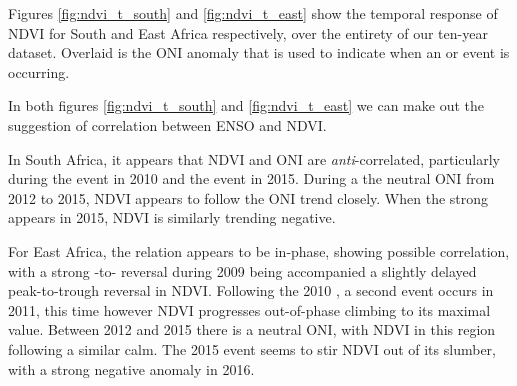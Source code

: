 Figures \ref{fig:ndvi_t_south} and \ref{fig:ndvi_t_east} show the
temporal response of NDVI for South and East Africa respectively, over
the entirety of our ten-year dataset. Overlaid is the ONI anomaly that
is used to indicate when an \elnino{} or \nina{} event is occurring.

In both figures \ref{fig:ndvi_t_south} and \ref{fig:ndvi_t_east} we
can make out the suggestion of correlation between ENSO and NDVI.

In South Africa, it appears that NDVI and ONI are
\emph{anti}-correlated, particularly during the \nina{} event in 2010
and the \elnino{} event in 2015. During a the neutral ONI from 2012 to
2015, NDVI appears to follow the ONI trend closely. When the strong
\elnino{} appears in 2015, NDVI is similarly trending negative.

For East Africa, the relation appears to be in-phase, showing possible
correlation, with a strong \elnino{}-to-\nina{} reversal during 2009
being accompanied a slightly delayed peak-to-trough reversal in
NDVI. Following the 2010 \nina{}, a second \nina{} event occurs in
2011, this time however NDVI progresses out-of-phase climbing to its
maximal value. Between 2012 and 2015 there is a neutral ONI, with NDVI
in this region following a similar calm. The 2015 \elnino{} event
seems to stir NDVI out of its slumber, with a strong negative anomaly
in 2016.

